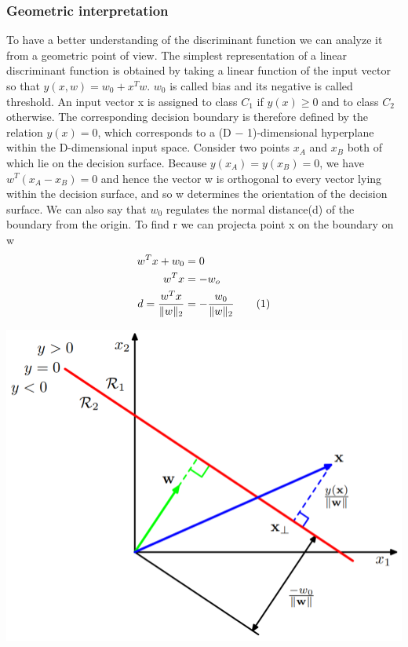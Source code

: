 \documentclass[main.tex]{subfiles}
\newcommand\numberthis{\addtocounter{equation}{1}\tag{\theequation}}
\begin{document}
\subsubsection{Geometric interpretation}
To have a better understanding of the discriminant function we can analyze it from a geometric point of view. The simplest representation of a linear discriminant function is obtained by taking a linear function of the input vector so that $y(x,w) = w_0 + x^Tw$. $w_0$ is called bias and its negative is called threshold. An input vector x is assigned to class $C_1$ if $y(x) \geq 0$ and to class $C_2$ otherwise. The corresponding decision boundary is therefore defined by the relation $y(x)=0$, which corresponds to a (D − 1)-dimensional hyperplane within the D-dimensional input space. Consider two points $x_A$ and $x_B$ both of which lie on the decision surface.
Because $y(x_A) = y(x_B)=0$, we have $w^T(x_A −x_B)=0$ and hence the vector w is orthogonal to every vector lying within the decision surface\footnotemark, and so w determines the
orientation of the decision surface.
We can also say that $w_0$ regulates the normal distance(d) of the boundary from the origin. To find r we can project\footnotemark a point x on the boundary on w
\begin{align*}
    w^Tx + w_0 &= 0 \\
    w^Tx &= -w_o \\
    d = \frac{w^Tx}{\|w\|_2} & = -\frac{w_0}{\|w\|_2} \numberthis
\end{align*}
\begin{center}
    \includegraphics[scale=0.6]{img/Linearboundary.PNG}
\end{center}
\end{document}
